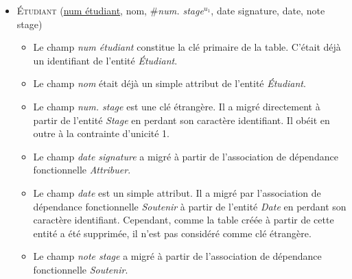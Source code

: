 \documentclass[a4paper]{article}
\newcommand{\relat}[1]{\textsc{#1}}
\newcommand{\attr}[1]{#1}
\newcommand{\prim}[1]{\uline{#1}}
\newcommand{\foreign}[1]{\#\textsl{#1}}
\begin{document}
\begin{itemize}
  \item \relat{Étudiant} (\prim{num étudiant}, \attr{nom}, \foreign{num. stage}$^{u_1}$, \attr{date signature}, \attr{date}, \attr{note stage})
  \begin{itemize}
    \item Le champ \emph{num étudiant} constitue la clé primaire de la table. C'était déjà un identifiant de l'entité \emph{Étudiant}.
    \item Le champ \emph{nom} était déjà un simple attribut de l'entité \emph{Étudiant}.
    \item Le champ \emph{num. stage} est une clé étrangère. Il a migré directement à partir de l'entité \emph{Stage} en perdant son caractère identifiant. Il obéit en outre à la contrainte d'unicité 1.
    \item Le champ \emph{date signature} a migré à partir de l'association de dépendance fonctionnelle \emph{Attribuer}.
    \item Le champ \emph{date} est un simple attribut. Il a migré par l'association de dépendance fonctionnelle \emph{Soutenir} à partir de l'entité \emph{Date} en perdant son caractère identifiant. Cependant, comme la table créée à partir de cette entité a été supprimée, il n'est pas considéré comme clé étrangère.
    \item Le champ \emph{note stage} a migré à partir de l'association de dépendance fonctionnelle \emph{Soutenir}.
  \end{itemize}

\end{itemize}
\end{document}

